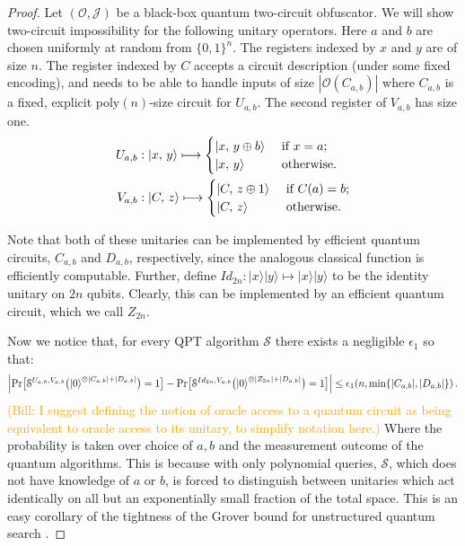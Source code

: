 \documentclass[11pt]{article}
\numberwithin{equation}{section}
\newcommand{\algo}{\mathcal}
\newcommand{\wf}[1]{{ \textcolor{orange}{(Bill:  #1)}}{}}
\begin{document}
\begin{proof}
Let $(\mathcal O, \mathcal J)$ be a black-box quantum two-circuit obfuscator. 
We will show two-circuit impossibility for the following unitary operators. Here $a$ and $b$ are chosen uniformly at random from $\{0,1\}^n$.  The registers indexed by $x$ and $y$ are of size $n$. The register indexed by $C$ accepts a circuit description (under some fixed encoding), and needs to be able to handle inputs of size $|\algo O(C_{a, b})|$ where $C_{a, b}$ is a fixed, explicit poly$(n)$-size circuit for $U_{a, b}$. The second register of $V_{a, b}$ has size one.
\begin{align}\label{eq:pair-impossible}
U_{a, b} &: {\left\vert{x,\, y}\right\rangle} \longmapsto
\begin{cases}
{\left\vert{x,\, y \oplus b}\right\rangle} &\text{ if } x = a;\\
{\left\vert{x,\, y}\right\rangle} &\text{ otherwise}.
\end{cases}\\
V_{a, b} &: {\left\vert{C,\, z}\right\rangle} \longmapsto
\begin{cases}
{\left\vert{C,\, z \oplus 1}\right\rangle} &\text{ if } C(a) = b;\\
{\left\vert{C,\, z}\right\rangle} &\text{ otherwise}.
\end{cases}
\end{align}

Note that both of these unitaries can be implemented by efficient quantum circuits, $C_{a,b}$ and $D_{a,b}$, respectively, since the analogous classical function is efficiently computable.  Further, define $Id_{2n}:|x\rangle|y\rangle\longmapsto|x\rangle|y\rangle$ to be the identity unitary on $2n$ qubits.  Clearly, this can be implemented by an efficient quantum circuit, which we call $Z_{2n}$.

Now we notice that, for every QPT algorithm $\mathcal S$ there exists a negligible $\epsilon_1$ so that:
\begin{equation}\label{eqn1}\Bigl| \text{Pr}\bigl[\mathcal S^{U_{a,b}, V_{a,b}}\bigl({\left\vert{0}\right\rangle}^{\otimes |C_{a,b}| + |D_{a,b}|}\bigr) = 1\bigr]- \text{Pr}\bigl[\mathcal S^{Id_{2n}, V_{a,b}}\bigl({\left\vert{0}\right\rangle}^{\otimes |Z_{2n}| + |D_{a,b}|}\bigr) = 1\bigr] \Bigr| \leq \epsilon_1(n, \min\{|C_{a,b}|,|D_{a,b}|\})\,.\end{equation}
\wf{I suggest defining the notion of oracle access to a quantum circuit as being equivalent to oracle access to its unitary, to simplify notation here.}
Where the probability is taken over choice of $a,b$ and the measurement outcome of the quantum algorithms.
 This is because with only polynomial queries, $\mathcal S$, which does not have knowledge of $a$ or $b$, is forced to distinguish between unitaries which act identically on all but an exponentially small fraction of the total space.  This is an easy corollary of the tightness of the Grover bound for unstructured quantum search \cite{BBBV}.
  

\end{proof}
\end{document}
